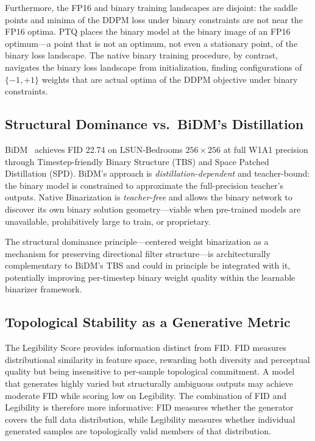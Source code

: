 \documentclass[conference]{IEEEtran}
\begin{document}
Furthermore, the FP16 and binary training landscapes are disjoint: the saddle points and
minima of the DDPM loss under binary constraints are not near the FP16 optima. PTQ
places the binary model at the binary image of an FP16 optimum---a point that is not an
optimum, not even a stationary point, of the binary loss landscape. The native binary
training procedure, by contrast, navigates the binary loss landscape from initialization,
finding configurations of $\{-1,+1\}$ weights that are actual optima of the DDPM
objective under binary constraints.

\subsection{Structural Dominance vs.\ BiDM's Distillation}

BiDM~\cite{bidm2024} achieves FID 22.74 on LSUN-Bedrooms $256{\times}256$ at full W1A1
precision through Timestep-friendly Binary Structure (TBS) and Space Patched Distillation
(SPD). BiDM's approach is \emph{distillation-dependent} and teacher-bound: the binary
model is constrained to approximate the full-precision teacher's outputs. Native
Binarization is \emph{teacher-free} and allows the binary network to discover its own
binary solution geometry---viable when pre-trained models are unavailable, prohibitively
large to train, or proprietary.

The structural dominance principle---centered weight binarization as a mechanism for
preserving directional filter structure---is architecturally complementary to BiDM's TBS
and could in principle be integrated with it, potentially improving per-timestep binary
weight quality within the learnable binarizer framework.

\subsection{Topological Stability as a Generative Metric}

The Legibility Score provides information distinct from FID. FID measures distributional
similarity in feature space, rewarding both diversity and perceptual quality but being
insensitive to per-sample topological commitment. A model that generates highly varied
but structurally ambiguous outputs may achieve moderate FID while scoring low on
Legibility. The combination of FID and Legibility is therefore more informative: FID
measures whether the generator covers the full data distribution, while Legibility
measures whether individual generated samples are topologically valid members of that
distribution.
\end{document}
